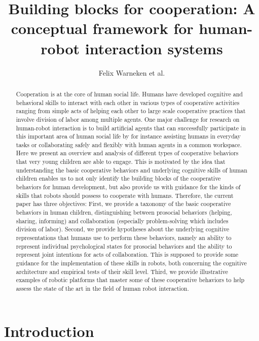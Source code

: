 \documentclass{article}
\title{Building blocks for cooperation: A conceptual framework for human-robot interaction systems}
\author{Felix Warneken et al.}
\begin{document}
\maketitle
\tableofcontents

\begin{abstract}

Cooperation is at the core of human social life. Humans have developed
cognitive and behavioral skills to interact with each other in various types of
cooperative activities ranging from simple acts of helping each other to large
scale cooperative practices that involve division of labor among multiple
agents. One major challenge for research on human-robot interaction is to build
artificial agents that can successfully participate in this important area of
human social life by for instance assisting humans in everyday tasks or
collaborating safely and flexibly with human agents in a common workspace. Here
we present an overview and analysis of different types of cooperative behaviors
that very young children are able to engage. This is motivated by the idea that
understanding the basic cooperative behaviors and underlying cognitive skills
of human children enables us to not only identify the building blocks of the
cooperative behaviors for human development, but also provide us with guidance
for the kinds of skills that robots should possess to cooperate with humans.
Therefore, the current paper has three objectives: First, we provide a
taxonomy of the basic cooperative behaviors in human children,
distinguishing between prosocial behaviors (helping, sharing, informing)
and collaboration (especially problem-solving which includes division of
labor). Second, we provide hypotheses about the underlying cognitive
representations that humans use to perform these behaviors, namely an
ability to represent individual psychological states for prosocial
behaviors and the ability to represent joint intentions for acts of
collaboration. This is supposed to provide some guidance for the
implementation of these skills in robots, both concerning the cognitive
architecture and empirical tests of their skill level. Third, we provide
illustrative examples of robotic platforms that master some of these
cooperative behaviors to help assess the state of the art in the field of
human robot interaction.

\end{abstract}

\section{Introduction}
\end{document}

